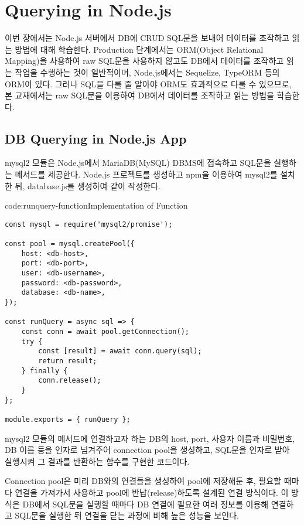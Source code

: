\section{Querying in Node.js}\label{sect:querying-in-node-js}

이번 장에서는 Node.js 서버에서 DB에 CRUD SQL문을 보내어 데이터를 조작하고 읽는 방법에 대해 학습한다. Production 단계에서는 ORM(Object Relational Mapping)을 사용하여 raw SQL문을 사용하지 않고도 DB에서 데이터를 조작하고 읽는 작업을 수행하는 것이 일반적이며, Node.js에서는 Sequelize, TypeORM 등의 ORM이 있다. 그러나 SQL을 다룰 줄 알아야 ORM도 효과적으로 다룰 수 있으므로, 본 교재에서는 raw SQL문을 이용하여 DB에서 데이터를 조작하고 읽는 방법을 학습한다.

\subsection*{DB Querying in Node.js App}

mysql2 모듈은 Node.js에서 MariaDB(MySQL) DBMS에 접속하고 SQL문을 실행하는 메서드를 제공한다. Node.js 프로젝트를 생성하고 npm을 이용하여 mysql2를 설치한 뒤, database.js를 생성하여 \과 같이 작성한다.

\begin{codeenv}{code:runquery-function}{Implementation of  Function}\begin{verbatim}
const mysql = require('mysql2/promise');

const pool = mysql.createPool({
    host: <db-host>,
    port: <db-port>,
    user: <db-username>,
    password: <db-password>,
    database: <db-name>,
});

const runQuery = async sql => {
    const conn = await pool.getConnection();
    try {
        const [result] = await conn.query(sql);
        return result;
    } finally {
        conn.release();
    }
};

module.exports = { runQuery };
\end{verbatim}
\end{codeenv}

\은 mysql2 모듈의  메서드에 연결하고자 하는 DB의 host, port, 사용자 이름과 비밀번호, DB 이름 등을 인자로 넘겨주어 connection pool을 생성하고, SQL문을 인자로 받아 실행시켜 그 결과를 반환하는  함수를 구현한 코드이다.

Connection pool은 미리 DB와의 연결들을 생성하여 pool에 저장해둔 후, 필요할 때마다 연결을 가져가서 사용하고  pool에 반납(release)하도록 설계된 연결 방식이다. 이 방식은 DB에서 SQL문을 실행할 때마다 DB 연결에 필요한 여러 정보를 이용해 연결하고 SQL문을 실행한 뒤 연결을 닫는 과정에 비해 높은 성능을 보인다.

